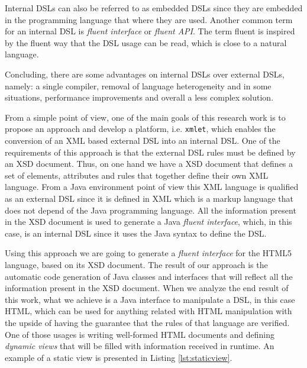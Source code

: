 \noindent
Internal \ac{DSL}s can also be referred to as embedded \ac{DSL}s since they are embedded in the programming language that where they are used. Another common term for an internal \ac{DSL} is \textit{fluent interface} or \textit{fluent \ac{API}}. The term fluent is inspired by the fluent way that the \ac{DSL} usage can be read, which is close to a natural language.

\noindent
Concluding, there are some advantages on internal \ac{DSL}s over external \ac{DSL}s, namely: a single compiler, removal of language heterogeneity and in some situations, performance improvements and overall a less complex solution.

\noindent
From a simple point of view, one of the main goals of this research work is to propose an approach and develop a platform, i.e. \texttt{xmlet}, which enables the conversion of an \ac{XML} based external \ac{DSL} into an internal \ac{DSL}. One of the requirements of this approach is that the external \ac{DSL} rules must be defined by an \ac{XSD} document. Thus, on one hand we have a \ac{XSD} document that defines a set of elements, attributes and rules that together define their own \ac{XML} language. From a Java environment point of view this \ac{XML} language is qualified as an external \ac{DSL} since it is defined in \ac{XML} which is a markup language that does not depend of the Java programming language. All the information present in the \ac{XSD} document is used to generate a Java \textit{fluent interface}, which, in this case, is an internal \ac{DSL} since it uses the Java syntax to define the \ac{DSL}. 

\noindent
Using this approach we are going to generate a \textit{fluent interface} for the \ac{HTML}5 language, based on its \ac{XSD} document. The result of our approach is the automatic code generation of Java classes and interfaces that will reflect all the information present in the \ac{XSD} document. When we analyze the end result of this work, what we achieve is a Java interface to manipulate a \ac{DSL}, in this case \ac{HTML}, which can be used for anything related with \ac{HTML} manipulation with the upside of having the guarantee that the rules of that language are verified. One of those usages is writing well-formed \ac{HTML} documents and defining \textit{dynamic views} that will be filled with information received in runtime. An example of a static view is presented in Listing \ref{lst:staticview}.

\bigskip


